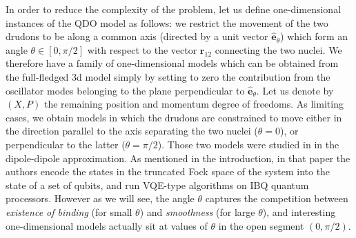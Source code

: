 \documentclass[reprint, amsmath, amssymb, floatfix, aps, pra]{revtex4-2}
\begin{document}
        In order to reduce the complexity of the problem, let us define one-dimensional instances of the QDO model as follows: we restrict the movement of the two drudons to be along a common axis (directed by a unit vector $\hat{\bm e}_\theta$) which form an angle $\theta\in[0,\pi/2]$ with respect to the vector $\bm r_{12}$ connecting the two nuclei. We therefore have a family of one-dimensional models which can be obtained from the full-fledged 3d model simply by setting to zero the contribution from the oscillator modes belonging to the plane perpendicular to $\hat{\bm e}_\theta$. Let us denote by $(X, P)$ the remaining position and momentum degree of freedoms. As limiting cases, we obtain models in which the drudons are constrained to move either in the direction parallel to the axis separating the two nuclei ($\theta=0$), or perpendicular to the latter ($\theta=\pi/2$). Those two models were studied in \cite{anderson2022coarse} in the dipole-dipole approximation. As mentioned in the introduction, in that paper the authors encode the states in the truncated Fock space of the system into the state of a set of qubits, and run VQE-type algorithms on IBQ quantum processors. However as we will see, the angle $\theta$ captures the competition between \textit{existence of binding} (for small $\theta$) and \textit{smoothness} (for large $\theta$), and interesting one-dimensional models actually sit at values of $\theta$ in the open segment $(0,\pi/2)$.
\end{document}
